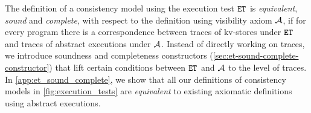 The definition of a consistency model using the execution test \( \et \) is \emph{equivalent}, 
\ie \emph{sound} and \emph{complete},
with respect to the definition using visibility axiom \( \visaxioms \),
if for every program there is a correspondence
between traces of kv-stores under \( \et \) and 
traces of abstract executions under \( \visaxioms \).
Instead of directly working on traces,
we introduce soundness and completeness constructors (\cref{sec:et-sound-complete-constructor})
that lift certain conditions between \( \et \) and \( \visaxioms \) to the level of traces. 
In \cref{app:et_sound_complete}, we show that 
all our definitions of consistency models in \cref{fig:execution_tests} 
are \emph{equivalent} to existing axiomatic definitions using abstract executions.
